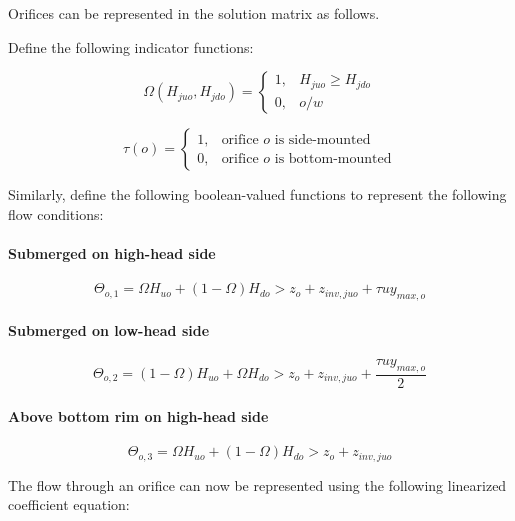 \documentclass[11pt]{article}
\begin{document}
Orifices can be represented in the solution matrix as follows.

Define the following indicator functions:

\begin{equation}
  \Omega(H_{juo}, H_{jdo}) = 
  \begin{cases}
    1, & H_{juo} \geq H_{jdo} \\
    0, & o/w
  \end{cases}
\end{equation}

\begin{equation}
  \tau(o) = 
  \begin{cases}
    1, & \text{orifice $o$ is side-mounted} \\
    0, & \text{orifice $o$ is bottom-mounted}
  \end{cases}
\end{equation}

Similarly, define the following boolean-valued functions to represent the
following flow conditions:

\paragraph{Submerged on high-head side}

\begin{equation}
  \Theta_{o,1} = \Omega H_{uo} + (1 - \Omega) H_{do} > z_o + z_{inv,juo} + \tau u y_{max,o}
\end{equation}

\paragraph{Submerged on low-head side}

\begin{equation}
  \Theta_{o,2} = (1 - \Omega) H_{uo} + \Omega H_{do} > z_o + z_{inv,juo} + \frac{\tau u y_{max,o}}{2} 
\end{equation}

\paragraph{Above bottom rim on high-head side}

\begin{equation}
  \Theta_{o,3} = \Omega H_{uo} + (1 - \Omega) H_{do} > z_o + z_{inv,juo}
\end{equation}

The flow through an orifice can now be represented using the following
linearized coefficient equation:
\end{document}
